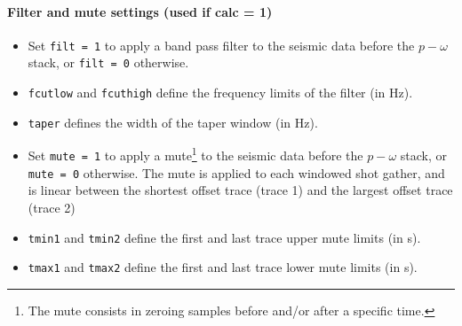 \documentclass[twoside,a4paper]{article}
\begin{document}
\paragraph{Filter and mute settings (used if calc = 1)}
\begin{itemize}[leftmargin=*]
\setlength\itemsep{2ex}
\item Set \verb|filt = 1| to apply a band pass filter to the seismic data before the $p-\omega$ stack, or \verb|filt = 0| otherwise.

\item \verb|fcutlow| and \verb|fcuthigh| define the frequency limits of the filter (in Hz).

\item \verb|taper| defines the width of the taper window (in Hz).

\item Set \verb|mute = 1| to apply a mute\footnote{The mute consists in zeroing samples before and/or after a specific time.} to the seismic data before the $p-\omega$ stack, or \verb|mute = 0| otherwise. The mute is applied to each windowed shot gather, and is linear between the shortest offset trace (trace 1) and the largest offset trace (trace 2)

\item \verb|tmin1| and \verb|tmin2| define the first and last trace upper mute limits (in s).

\item \verb|tmax1| and \verb|tmax2| define the first and last trace lower mute limits (in s).
\end{itemize}
\end{document}
